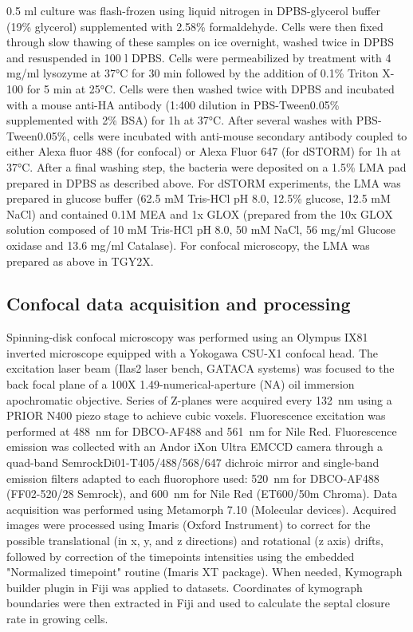 0.5 ml culture was flash-frozen using liquid nitrogen in DPBS-glycerol buffer (19\% glycerol) supplemented with 2.58\% formaldehyde.
Cells were then fixed through slow thawing of these samples on ice overnight, washed twice in DPBS and resuspended in 100 \mu{}l DPBS.
Cells were permeabilized by treatment with 4 mg/ml lysozyme at \ang{37}C for 30 min followed by the addition of 0.1\% Triton X-100 for 5 min at \ang{25}C.
Cells were then washed twice with DPBS and incubated with a mouse anti-HA antibody (1:400 dilution in PBS-Tween0.05\% supplemented with 2\% BSA) for 1h at \ang{37}C.
After several washes with PBS-Tween0.05\%, cells were incubated with anti-mouse secondary antibody coupled to either Alexa fluor 488 (for confocal) or Alexa Fluor 647 (for dSTORM) for 1h at \ang{37}C.
After a final washing step, the bacteria were deposited on a 1.5\% LMA pad prepared in DPBS as described above.
For dSTORM experiments, the LMA was prepared in glucose buffer (62.5 mM Tris-HCl pH 8.0, 12.5\% glucose, 12.5 mM NaCl) and contained 0.1M MEA and 1x GLOX (prepared from the 10x GLOX solution composed of 10 mM Tris-HCl pH 8.0, 50 mM NaCl, 56 mg/ml Glucose oxidase and 13.6 mg/ml Catalase).
For confocal microscopy, the LMA was prepared as above in TGY2X.

\subsection{Confocal data acquisition and processing}

Spinning-disk confocal microscopy was performed using an Olympus IX81 inverted microscope equipped with a Yokogawa CSU-X1 confocal head.
The excitation laser beam (Ilas2 laser bench, GATACA systems) was focused to the back focal plane of a 100X 1.49-numerical-aperture (NA) oil immersion apochromatic objective.
Series of Z-planes were acquired every \qty{132}{nm} using a PRIOR N400 piezo stage to achieve cubic voxels.
Fluorescence excitation was performed at \qty{488}{nm} for DBCO-AF488 and \qty{561}{nm} for Nile Red.
Fluorescence emission was collected with an Andor iXon Ultra EMCCD camera through a quad-band Semrock\texttrademark Di01-T405/488/568/647 dichroic mirror and single-band emission filters adapted to each fluorophore used: \qty{520}{nm} for DBCO-AF488 (FF02-520/28 Semrock\texttrademark), and \qty{600}{nm} for Nile Red (ET600/50m Chroma\texttrademark).
Data acquisition was performed using Metamorph 7.10 (Molecular devices).
Acquired images were processed using Imaris (Oxford Instrument\texttrademark) to correct for the possible translational (in x, y, and z directions) and rotational (z axis) drifts, followed by correction of the timepoints intensities using the embedded "Normalized timepoint" routine (Imaris XT package).
When needed, Kymograph builder plugin in Fiji was applied to datasets.
Coordinates of kymograph boundaries were then extracted in Fiji and used to calculate the septal closure rate in growing cells.

